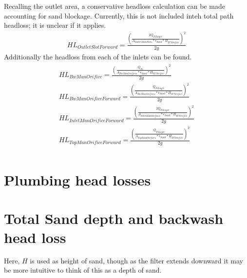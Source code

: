 \documentclass[letterpaper,10pt,english]{sphinxmanual}
\begin{document}
Recalling the outlet area, a conservative headloss calculation can be made accounting for sand blockage. Currently, this is not included inteh total path headloss; it is unclear if it applies.
\begin{equation}\label{equation:Filtration/Filtration_Derivations:Filtration/Filtration_Derivations:55}
\begin{split}HL_{OutletSlotForward} = \frac{(\frac{2Q_{FiLayer}}{A_{OutletManSlots}*\epsilon_{Sand}*\Pi_{VCOrifice}})^2}{2g}\end{split}
\end{equation}
Additionally the headloss from each of the inlets can be found.
\begin{align}\label{equation:Filtration/Filtration_Derivations:Filtration/Filtration_Derivations:56}\!\begin{aligned}
HL_{BwManOrifice} = \frac{(\frac{Q_{Fi}}{A_{BwManOrifices}*\epsilon_{Sand}*\Pi_{VCOrifice}})^2}{2g}\\
HL_{BwManOrificeForward} = \frac{(\frac{Q_{FiLayer}}{A_{BwManOrifices}*\epsilon_{Sand}*\Pi_{VCOrifice}})^2}{2g}\\
HL_{InletManOrificeForward} = \frac{(\frac{2Q_{FiLayer}}{A_{InletManOrifices}*\epsilon_{Sand}*\Pi_{VCOrifice}})^2}{2g}\\
HL_{TopManOrificeForward} = \frac{(\frac{Q_{FiLayer}}{A_{TopManOrifices}*\epsilon_{Sand}*\Pi_{VCOrifice}})^2}{2g}\\
\end{aligned}\end{align}

\section{Plumbing head losses}
\label{\detokenize{Filtration/Filtration_Derivations:plumbing-head-losses}}

\section{Total Sand depth and backwash head loss}
\label{\detokenize{Filtration/Filtration_Derivations:total-sand-depth-and-backwash-head-loss}}
Here, \(H\) is used as height of sand, though as the filter extends downward it may be more intuitive to think of this as a depth of sand.
\end{document}
